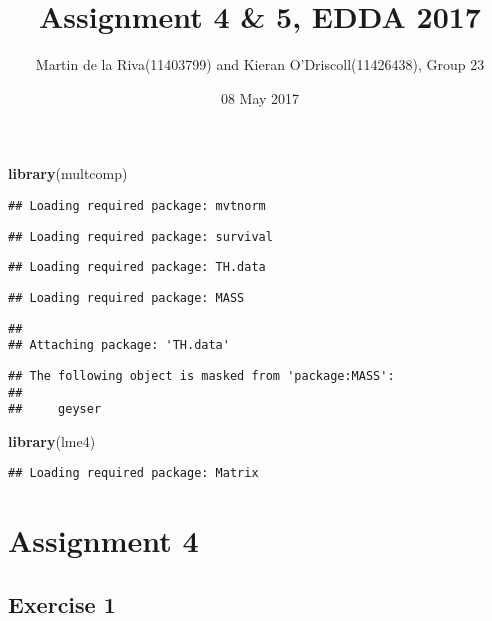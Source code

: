 \documentclass[11pt,]{article}
\title{Assignment 4 \& 5, EDDA 2017}
\author{Martin de la Riva(11403799) and Kieran O'Driscoll(11426438), Group 23}
\date{08 May 2017}
\newenvironment{Shaded}{\begin{snugshade}}{\end{snugshade}}
\newcommand{\KeywordTok}[1]{\textcolor[rgb]{0.13,0.29,0.53}{\textbf{{#1}}}}
\newcommand{\NormalTok}[1]{{#1}}
\begin{document}
\maketitle

\begin{Shaded}
\begin{Highlighting}[]
\KeywordTok{library}\NormalTok{(multcomp)}
\end{Highlighting}
\end{Shaded}

\begin{verbatim}
## Loading required package: mvtnorm
\end{verbatim}

\begin{verbatim}
## Loading required package: survival
\end{verbatim}

\begin{verbatim}
## Loading required package: TH.data
\end{verbatim}

\begin{verbatim}
## Loading required package: MASS
\end{verbatim}

\begin{verbatim}
## 
## Attaching package: 'TH.data'
\end{verbatim}

\begin{verbatim}
## The following object is masked from 'package:MASS':
## 
##     geyser
\end{verbatim}

\begin{Shaded}
\begin{Highlighting}[]
\KeywordTok{library}\NormalTok{(lme4)}
\end{Highlighting}
\end{Shaded}

\begin{verbatim}
## Loading required package: Matrix
\end{verbatim}

\section{Assignment 4}\label{assignment-4}

\subsection{Exercise 1}\label{exercise-1}
\end{document}
